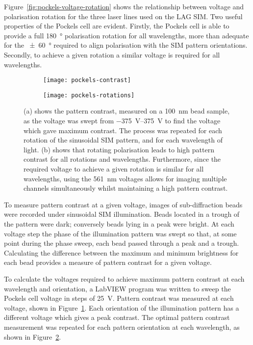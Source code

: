 Figure~\ref{fig:pockels-voltage-rotation} shows the relationship between voltage and polarisation rotation for the three laser lines used on the LAG SIM.
Two useful properties of the Pockels cell are evident.
Firstly, the Pockels cell is able to provide a full \SI{180}{\degree} polarisation rotation for all wavelengths, more than adequate for the \SI{\pm60}{\degree} required to align polarisation with the SIM pattern orientations.
Secondly, to achieve a given rotation a similar voltage is required for all wavelengths.

\begin{figure}[p!]
\centering
\begin{subfigure}[b]{\textwidth}
	\texttt{[image: pockels-contrast]}
	\caption{}\label{fig:pockels-contrast}
\end{subfigure}
\begin{subfigure}[b]{\textwidth}
	\texttt{[image: pockels-rotations]}
	\caption{}\label{fig:pockels-optimal}
\end{subfigure}
\caption[LAG SIM: Measurements of a bead sample reveal the optimal Pockels cell voltages for maximum pattern contrast]{(a) shows the pattern contrast, measured on a \SI{100}{\nano\metre} bead sample, as the voltage was swept from \SIrange{-375}{375}{\volt} to find the voltage which gave maximum contrast. The process was repeated for each rotation of the sinusoidal SIM pattern, and for each wavelength of light. (b) shows that rotating polarisation leads to high pattern contrast for all rotations and wavelengths. Furthermore, since the required voltage to achieve a given rotation is similar for all wavelengths, using the \SI{561}{\nano\metre} voltages allows for imaging multiple channels simultaneously whilst maintaining a high pattern contrast.}
\label{fig:pockels-contrast-figures}
\end{figure}
\afterpage{\clearpage}

To measure pattern contrast at a given voltage, images of sub-diffraction beads were recorded under sinusoidal SIM illumination.
Beads located in a trough of the pattern were dark; conversely beads lying in a peak were bright.
At each voltage step the phase of the illumination pattern was swept so that, at some point during the phase sweep, each bead passed through a peak and a trough.
Calculating the difference between the maximum and minimum brightness for each bead provides a measure of pattern contrast for a given voltage.

To calculate the voltages required to achieve maximum pattern contrast at each wavelength and orientation, a LabVIEW program was written to sweep the Pockels cell voltage in steps of \SI{25}{\volt}.
Pattern contrast was measured at each voltage, shown in Figure~\ref{fig:pockels-contrast}.
Each orientation of the illumination pattern has a different voltage which gives a peak contrast.
The optimal pattern contrast measurement was repeated for each pattern orientation at each wavelength, as shown in Figure~\ref{fig:pockels-optimal}.

